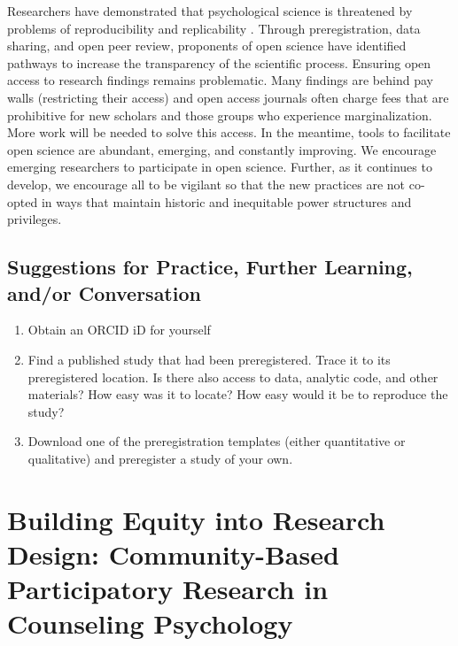 \documentclass[
  11pt,
]{book}
\providecommand{\tightlist}{%
  \setlength{\itemsep}{0pt}\setlength{\parskip}{0pt}}
\begin{document}
Researchers have demonstrated that psychological science is threatened by problems of reproducibility and replicability \citep{open_science_collaboration_estimating_2015}. Through preregistration, data sharing, and open peer review, proponents of open science have identified pathways to increase the transparency of the scientific process. Ensuring open access to research findings remains problematic. Many findings are behind pay walls (restricting their access) and open access journals often charge fees that are prohibitive for new scholars and those groups who experience marginalization. More work will be needed to solve this access. In the meantime, tools to facilitate open science are abundant, emerging, and constantly improving. We encourage emerging researchers to participate in open science. Further, as it continues to develop, we encourage all to be vigilant so that the new practices are not co-opted in ways that maintain historic and inequitable power structures and privileges.

\hypertarget{suggestions-for-practice-further-learning-andor-conversation}{%
\section{Suggestions for Practice, Further Learning, and/or Conversation}\label{suggestions-for-practice-further-learning-andor-conversation}}

\begin{enumerate}
\def\labelenumi{\arabic{enumi}.}
\tightlist
\item
  Obtain an ORCID iD for yourself
\item
  Find a published study that had been preregistered. Trace it to its preregistered location. Is there also access to data, analytic code, and other materials? How easy was it to locate? How easy would it be to reproduce the study?
\item
  Download one of the preregistration templates (either quantitative or qualitative) and preregister a study of your own.
\end{enumerate}

\hypertarget{ComRes}{%
\chapter{Building Equity into Research Design: Community-Based Participatory Research in Counseling Psychology}\label{ComRes}}
\end{document}
